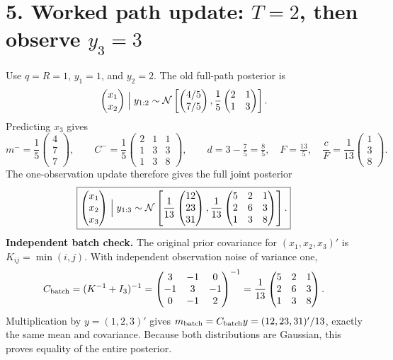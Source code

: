 \documentclass[10pt,a4paper]{article}
\newcommand{\Normal}{\mathcal N}
\begin{document}
\clearpage
\section*{5. Worked path update: $T=2$, then observe $y_3=3$}
Use $q=R=1$, $y_1=1$, and $y_2=2$. The old full-path posterior is
\[
\begin{pmatrix}x_1\\x_2\end{pmatrix}\Bigm|y_{1:2}
\sim\Normal\left[
\begin{pmatrix}4/5\\7/5\end{pmatrix},
\frac15\begin{pmatrix}2&1\\1&3\end{pmatrix}\right].
\]
Predicting $x_3$ gives
\[
m^-=\frac15\begin{pmatrix}4\\7\\7\end{pmatrix},\qquad
C^-=\frac15\begin{pmatrix}2&1&1\\1&3&3\\1&3&8\end{pmatrix},\qquad
d=3-\tfrac75=\tfrac85,\quad F=\tfrac{13}5,\quad
\frac cF=\frac1{13}\begin{pmatrix}1\\3\\8\end{pmatrix}.
\]
The one-observation update therefore gives the full joint posterior
\[
\boxed{
\begin{pmatrix}x_1\\x_2\\x_3\end{pmatrix}\Bigm|y_{1:3}
\sim\Normal\left[
\frac1{13}\begin{pmatrix}12\\23\\31\end{pmatrix},
\frac1{13}\begin{pmatrix}5&2&1\\2&6&3\\1&3&8\end{pmatrix}\right].
}
\]
\textbf{Independent batch check.} The original prior covariance for $(x_1,x_2,x_3)'$ is
$K_{ij}=\min(i,j)$. With independent observation noise of variance one,
\[
C_{\rm batch}=(K^{-1}+I_3)^{-1}
=\begin{pmatrix}3&-1&0\\-1&3&-1\\0&-1&2\end{pmatrix}^{-1}
=\frac1{13}\begin{pmatrix}5&2&1\\2&6&3\\1&3&8\end{pmatrix}.
\]
Multiplication by $y=(1,2,3)'$ gives
$m_{\rm batch}=C_{\rm batch}y=(12,23,31)'/13$, exactly the same mean and covariance.
Because both distributions are Gaussian, this proves equality of the entire posterior.
\end{document}
